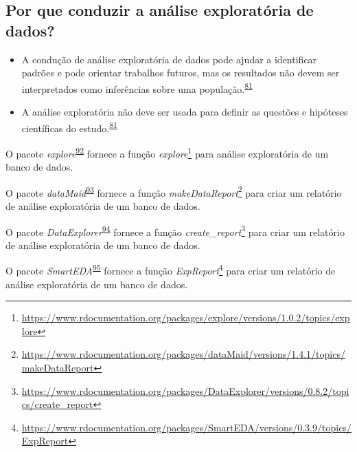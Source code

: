 \documentclass[
  a4paper,
]{book}
\renewcommand{\href}[2]{#2\footnote{\url{#1}}}
\newenvironment{infobox}[1]
  {
  \begin{itemize}
  \renewcommand{\labelitemi}{
    \raisebox{-.7\height}[0pt][0pt]{
      {\setkeys{Gin}{width=3em,keepaspectratio}
        \texttt{[image: \#1]}}
    }
  }
  \setlength{\fboxsep}{1em}
  \begin{blackbox}
  \item
  }
  {
  \end{blackbox}
  \end{itemize}
  }
\begin{document}
\hypertarget{por-que-conduzir-a-anuxe1lise-exploratuxf3ria-de-dados}{%
\subsection{Por que conduzir a análise exploratória de dados?}\label{por-que-conduzir-a-anuxe1lise-exploratuxf3ria-de-dados}}

\begin{itemize}
\item
  A condução de análise exploratória de dados pode ajudar a identificar padrões e pode orientar trabalhos futuros, mas os resultados não devem ser interpretados como inferências sobre uma população.\textsuperscript{\protect\hyperlink{ref-zuur2009}{81}}
\item
  A análise exploratória não deve ser usada para definir as questões e hipóteses científicas do estudo.\textsuperscript{\protect\hyperlink{ref-zuur2009}{81}}
\end{itemize}

\begin{infobox}{images/Rlogo}
O pacote \emph{explore}\textsuperscript{\protect\hyperlink{ref-explore}{92}} fornece a função \href{https://www.rdocumentation.org/packages/explore/versions/1.0.2/topics/explore}{\emph{explore}} para análise exploratória de um banco de dados.

\end{infobox}

\begin{infobox}{images/Rlogo}
O pacote \emph{dataMaid}\textsuperscript{\protect\hyperlink{ref-dataMaid}{93}} fornece a função \href{https://www.rdocumentation.org/packages/dataMaid/versions/1.4.1/topics/makeDataReport}{\emph{makeDataReport}} para criar um relatório de análise exploratória de um banco de dados.

\end{infobox}

\begin{infobox}{images/Rlogo}
O pacote \emph{DataExplorer}\textsuperscript{\protect\hyperlink{ref-DataExplorer-2}{94}} fornece a função \href{https://www.rdocumentation.org/packages/DataExplorer/versions/0.8.2/topics/create_report}{\emph{create\_report}} para criar um relatório de análise exploratória de um banco de dados.

\end{infobox}

\begin{infobox}{images/Rlogo}
O pacote \emph{SmartEDA}\textsuperscript{\protect\hyperlink{ref-SmartEDA}{95}} fornece a função \href{https://www.rdocumentation.org/packages/SmartEDA/versions/0.3.9/topics/ExpReport}{\emph{ExpReport}} para criar um relatório de análise exploratória de um banco de dados.

\end{infobox}
\end{document}

